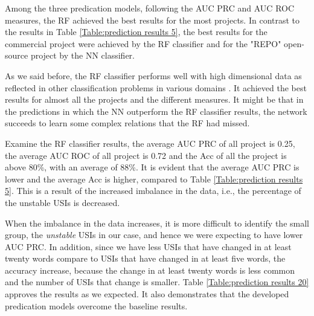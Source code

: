 Among the three predication models, following the AUC PRC and AUC ROC measures, the RF achieved the best results for the most projects. In contrast to the results in Table \ref{Table:prediction results 5}, the best results for the commercial project were achieved by the RF classifier and for the "REPO" open-source project by the NN classifier.

As we said before, the RF classifier performs well with high dimensional data \cite{caruana2008empirical} as reflected in other classification problems in various domains \cite{chen2012random}. It achieved the best results for almost all the projects and the different measures. It might be that in the predictions in which the NN outperform the RF classifier results, the network succeeds to learn some complex relations that the RF had missed.

Examine the RF classifier results, the average AUC PRC of all project is 0.25, the average AUC ROC of all project is 0.72 and the Acc of all the project is above 80\%, with an average of 88\%. It is evident that the average AUC PRC is lower and the average Acc is higher, compared to Table \ref{Table:prediction results 5}. This is a result of the increased imbalance in the data, i.e., the percentage of the unstable USIs is decreased.

When the imbalance in the data increases, it is more difficult to identify the small group, the \emph{unstable} USIs in our case, and hence we were expecting to have lower AUC PRC. In addition, since we have less USIs that have changed in at least twenty words compare to USIs that have changed in at least five words, the accuracy increase, because the change in at least twenty words is less common and the number of USIs that change is smaller. Table \ref{Table:prediction results 20} approves the results as we expected. It also demonstrates that the developed predication models overcome the baseline results.

    
